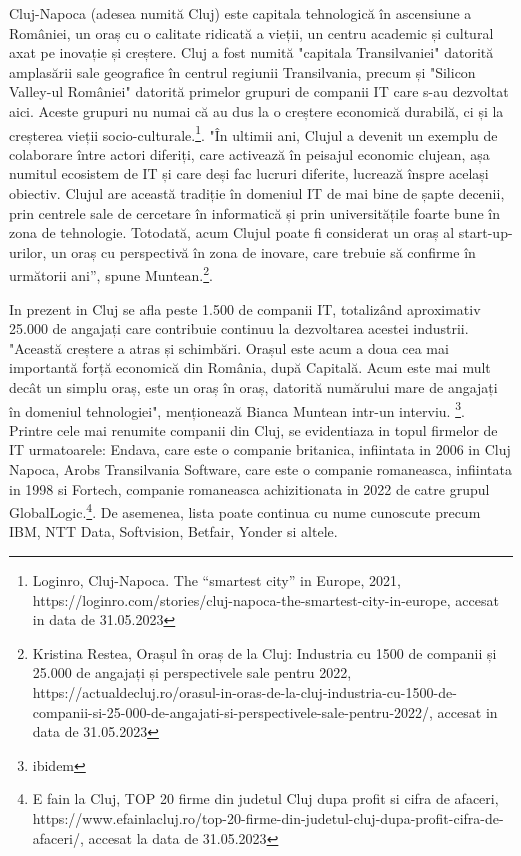 \documentclass[a4paper, 12pt]{article}
\begin{document}
	\quad\quad\space Cluj-Napoca (adesea numită Cluj) este capitala tehnologică în ascensiune a României, un oraș cu o calitate ridicată a vieții, un centru academic și cultural axat pe inovație și creștere. Cluj a fost numită "capitala Transilvaniei" datorită amplasării sale geografice în centrul regiunii Transilvania, precum și "Silicon Valley-ul României" datorită primelor grupuri de companii IT care s-au dezvoltat aici. Aceste grupuri nu numai că au dus la o creștere economică durabilă, ci și la creșterea vieții socio-culturale.\footnote{Loginro, Cluj-Napoca. The “smartest city” in Europe, 2021, https://loginro.com/stories/cluj-napoca-the-smartest-city-in-europe, accesat in data de 31.05.2023}. "În ultimii ani, Clujul a devenit un exemplu de colaborare între actori diferiți, care activează în peisajul economic clujean, așa numitul ecosistem de IT și care deși fac lucruri diferite, lucrează înspre același obiectiv. Clujul are această tradiție în domeniul IT de mai bine de șapte decenii, prin centrele sale de cercetare în informatică și prin universitățile foarte bune în zona de tehnologie. Totodată, acum Clujul poate fi considerat un oraș al start-up-urilor, un oraș cu perspectivă în zona de inovare, care trebuie să confirme în următorii ani”, spune Muntean.\footnote{Kristina Restea, Orașul în oraș de la Cluj: Industria cu 1500 de companii și 25.000 de angajați și perspectivele sale pentru 2022, https://actualdecluj.ro/orasul-in-oras-de-la-cluj-industria-cu-1500-de-companii-si-25-000-de-angajati-si-perspectivele-sale-pentru-2022/, accesat in data de 31.05.2023}. 


	\quad \quad In prezent in Cluj se afla peste 1.500 de companii IT, totalizând aproximativ 25.000 de angajați care contribuie continuu la dezvoltarea acestei industrii. "Această creștere a atras și schimbări. Orașul este acum a doua cea mai importantă forță economică din România, după Capitală. Acum este mai mult decât un simplu oraș, este un oraș în oraș, datorită numărului mare de angajați în domeniul tehnologiei", menționează Bianca Muntean intr-un interviu. \footnote{ibidem}. Printre cele mai renumite companii din Cluj, se evidentiaza in topul firmelor de IT urmatoarele: Endava, care este o companie britanica, infiintata in 2006 in Cluj Napoca, Arobs Transilvania Software, care este o companie romaneasca, infiintata in 1998 si Fortech, companie romaneasca achizitionata in 2022 de catre grupul GlobalLogic.\footnote{E fain la Cluj, TOP 20 firme din judetul Cluj dupa profit si cifra de afaceri, https://www.efainlacluj.ro/top-20-firme-din-judetul-cluj-dupa-profit-cifra-de-afaceri/, accesat la data de 31.05.2023}. De asemenea, lista poate continua cu nume cunoscute precum IBM, NTT Data, Softvision, Betfair, Yonder si altele.
\end{document}
